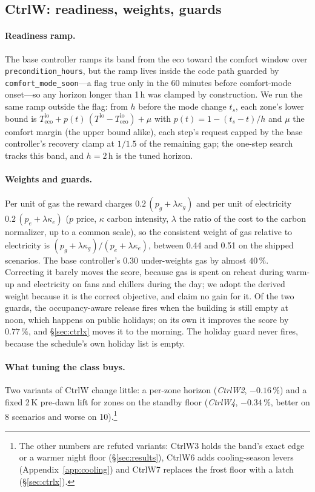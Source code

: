 \documentclass{article}
\newcommand{\cn}[1]{\texttt{#1}}
\begin{document}
\subsection{CtrlW: readiness, weights, guards}
\label{sec:ctrlw}

\paragraph{Readiness ramp.} The base controller ramps its band from the eco toward the comfort
window over \cn{precondition\_hours}, but the ramp lives inside the code path
guarded by \cn{comfort\_mode\_soon}---a flag true only in the 60 minutes before
comfort-mode onset---so any horizon longer than 1\,h was clamped by construction. We
run the same ramp outside the flag: from $h$ before the mode change $t_s$, each zone's lower bound is
$T^{\text{lo}}_{\text{eco}}+p(t)\,(T^{\text{lo}}-T^{\text{lo}}_{\text{eco}})+\mu$ with $p(t)=1-(t_s-t)/h$ and $\mu$ the
comfort margin (the upper bound alike), each step's request capped by the base controller's
recovery clamp at $1/1.5$ of the remaining gap; the one-step search tracks this band, and $h=2$\,h
is the tuned horizon.

\paragraph{Weights and guards.} Per unit of gas the reward charges $0.2\,(p_g+\lambda\kappa_g)$
and per unit of electricity $0.2\,(p_e+\lambda\kappa_e)$ ($p$ price, $\kappa$ carbon intensity,
$\lambda$ the ratio of the cost to the carbon normalizer, up to a common scale), so the
consistent weight of gas relative to electricity is $(p_g+\lambda\kappa_g)/(p_e+\lambda\kappa_e)$,
between 0.44 and 0.51 on the shipped scenarios. The base controller's 0.30 under-weights gas by
almost $40\,\%$. Correcting it barely moves the score, because gas is spent on reheat during
warm-up and electricity on fans and chillers during the day; we adopt the derived weight because
it is the correct objective, and claim no gain for it. Of the two guards, the occupancy-aware
release fires when the building is still empty at noon, which happens on public holidays; on
its own it improves the score by $0.77\,\%$, and \S\ref{sec:ctrlx} moves it to the morning. The
holiday guard never fires, because the schedule's own holiday list is empty.

\paragraph{What tuning the class buys.} Two variants of CtrlW change little: a per-zone horizon
(\emph{CtrlW2}, $-0.16\,\%$) and a fixed 2\,K pre-dawn lift for zones on the standby floor
(\emph{CtrlW4}, $-0.34\,\%$, better on 8 scenarios and worse on 10).\footnote{The other numbers
are refuted variants: CtrlW3 holds the band's exact edge or a warmer night floor
(\S\ref{sec:results}), CtrlW6 adds cooling-season levers (Appendix~\ref{app:cooling}) and CtrlW7
replaces the frost floor with a latch (\S\ref{sec:ctrlx}).}
\end{document}
